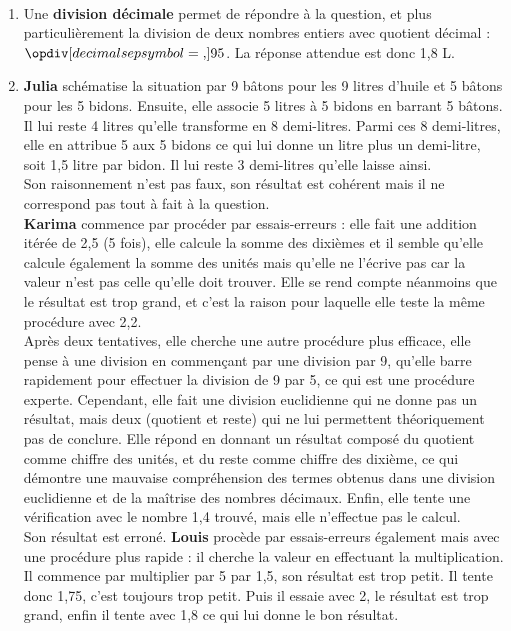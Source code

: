 \begin{corrige}
\ \\ [-5mm]
\begin{enumerate}
   \item Une \textbf{division décimale} permet de répondre à la question, et plus particulièrement la division de deux nombres entiers avec quotient décimal : $\opdiv[decimalsepsymbol={,}]{9}{5}$. \quad La réponse attendue est donc 1,8 L. \\
   \item \textbf{Julia} schématise la situation par 9 bâtons pour les 9 litres d'huile et 5 bâtons pour les 5 bidons. Ensuite, elle associe 5 litres à 5 bidons en barrant 5 bâtons. Il lui reste 4 litres qu'elle transforme en 8 demi-litres. Parmi ces 8 demi-litres, elle en attribue 5 aux 5 bidons ce qui lui donne un litre plus un demi-litre, soit 1,5 litre par bidon. Il lui reste 3 demi-litres qu'elle laisse ainsi. \\
      Son raisonnement n'est pas faux, son résultat est cohérent mais il ne correspond pas tout à fait à la question. \\
   \textbf{Karima} commence par procéder par essais-erreurs : elle fait une addition itérée de 2,5 (5 fois), elle calcule la somme des dixièmes et il semble qu'elle calcule également la somme des unités mais qu'elle ne l'écrive pas car la valeur n'est pas celle qu'elle doit trouver. Elle se rend compte néanmoins que le résultat est trop grand, et c'est la raison pour laquelle elle teste la même procédure avec 2,2. \\
      Après deux tentatives, elle cherche une autre procédure plus efficace, elle pense à une division en commençant par une division par 9, qu'elle barre rapidement pour effectuer la division de 9 par 5, ce qui est une procédure experte. Cependant, elle fait une division euclidienne qui ne donne pas un résultat, mais deux (quotient et reste) qui ne lui permettent théoriquement pas de conclure. Elle répond en donnant un résultat composé du quotient comme chiffre des unités, et du reste comme chiffre des dixième, ce qui démontre une mauvaise compréhension des termes obtenus dans une division euclidienne et de la maîtrise des nombres décimaux. Enfin, elle tente une vérification avec le nombre 1,4 trouvé, mais elle n'effectue pas le calcul. \\
      Son résultat est erroné.
   \textbf{Louis} procède par essais-erreurs également mais avec une procédure plus rapide : il cherche la valeur en effectuant la multiplication. Il commence par multiplier par 5 par 1,5, son résultat est trop petit. Il tente donc 1,75, c'est toujours trop petit. Puis il essaie avec 2, le résultat est trop grand, enfin il tente avec 1,8 ce qui lui donne le bon résultat. \\

\end{enumerate}
\end{corrige}
